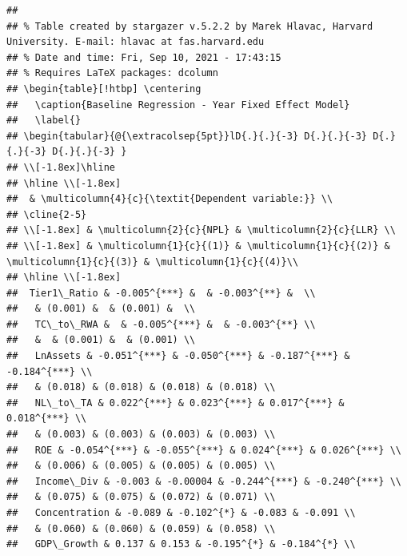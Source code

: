 \documentclass{article}
\begin{document}
\begin{verbatim}
## 
## % Table created by stargazer v.5.2.2 by Marek Hlavac, Harvard University. E-mail: hlavac at fas.harvard.edu
## % Date and time: Fri, Sep 10, 2021 - 17:43:15
## % Requires LaTeX packages: dcolumn 
## \begin{table}[!htbp] \centering 
##   \caption{Baseline Regression - Year Fixed Effect Model} 
##   \label{} 
## \begin{tabular}{@{\extracolsep{5pt}}lD{.}{.}{-3} D{.}{.}{-3} D{.}{.}{-3} D{.}{.}{-3} } 
## \\[-1.8ex]\hline 
## \hline \\[-1.8ex] 
##  & \multicolumn{4}{c}{\textit{Dependent variable:}} \\ 
## \cline{2-5} 
## \\[-1.8ex] & \multicolumn{2}{c}{NPL} & \multicolumn{2}{c}{LLR} \\ 
## \\[-1.8ex] & \multicolumn{1}{c}{(1)} & \multicolumn{1}{c}{(2)} & \multicolumn{1}{c}{(3)} & \multicolumn{1}{c}{(4)}\\ 
## \hline \\[-1.8ex] 
##  Tier1\_Ratio & -0.005^{***} &  & -0.003^{**} &  \\ 
##   & (0.001) &  & (0.001) &  \\ 
##   TC\_to\_RWA &  & -0.005^{***} &  & -0.003^{**} \\ 
##   &  & (0.001) &  & (0.001) \\ 
##   LnAssets & -0.051^{***} & -0.050^{***} & -0.187^{***} & -0.184^{***} \\ 
##   & (0.018) & (0.018) & (0.018) & (0.018) \\ 
##   NL\_to\_TA & 0.022^{***} & 0.023^{***} & 0.017^{***} & 0.018^{***} \\ 
##   & (0.003) & (0.003) & (0.003) & (0.003) \\ 
##   ROE & -0.054^{***} & -0.055^{***} & 0.024^{***} & 0.026^{***} \\ 
##   & (0.006) & (0.005) & (0.005) & (0.005) \\ 
##   Income\_Div & -0.003 & -0.00004 & -0.244^{***} & -0.240^{***} \\ 
##   & (0.075) & (0.075) & (0.072) & (0.071) \\ 
##   Concentration & -0.089 & -0.102^{*} & -0.083 & -0.091 \\ 
##   & (0.060) & (0.060) & (0.059) & (0.058) \\ 
##   GDP\_Growth & 0.137 & 0.153 & -0.195^{*} & -0.184^{*} \\ 

\end{verbatim}
\end{document}
